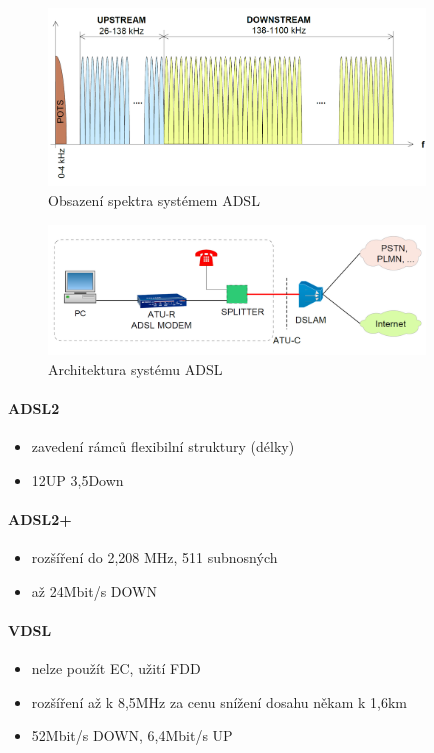 \documentclass[10pt,a4paper]{article}
\begin{document}
\begin{figure}[ht]
    \centering
    \includegraphics[width=10cm]{obsazeniAdsl.png}
    \caption{Obsazení spektra systémem ADSL}
    \label{fig:adslObsazeni}
\end{figure}
\begin{figure}[ht]
    \centering
    \includegraphics[width=10cm]{architekturaAdsl.png}
    \caption{Architektura systému ADSL}
    \label{fig:architekturaAdsl}
\end{figure}

\paragraph{ADSL2}
\begin{itemize}
\item zavedení rámců flexibilní struktury (délky)
\item 12UP 3,5Down
\end{itemize}

\paragraph{ADSL2+}
\begin{itemize}
\item rozšíření do 2,208 MHz, 511 subnosných
\item až 24Mbit/s DOWN
\end{itemize}

\paragraph{VDSL}
\begin{itemize}
\item nelze použít EC, užití FDD
\item rozšíření až k 8,5MHz za cenu snížení dosahu někam k 1,6km
\item 52Mbit/s DOWN, 6,4Mbit/s UP
\end{itemize}
\end{document}
